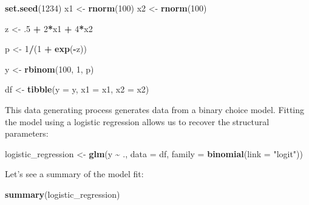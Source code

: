 \documentclass[
]{article}
\newenvironment{Shaded}{\begin{snugshade}}{\end{snugshade}}
\newcommand{\DataTypeTok}[1]{\textcolor[rgb]{0.13,0.29,0.53}{#1}}
\newcommand{\DecValTok}[1]{\textcolor[rgb]{0.00,0.00,0.81}{#1}}
\newcommand{\FloatTok}[1]{\textcolor[rgb]{0.00,0.00,0.81}{#1}}
\newcommand{\KeywordTok}[1]{\textcolor[rgb]{0.13,0.29,0.53}{\textbf{#1}}}
\newcommand{\NormalTok}[1]{#1}
\newcommand{\OperatorTok}[1]{\textcolor[rgb]{0.81,0.36,0.00}{\textbf{#1}}}
\newcommand{\StringTok}[1]{\textcolor[rgb]{0.31,0.60,0.02}{#1}}
\begin{document}
\begin{Shaded}
\begin{Highlighting}[]
\KeywordTok{set.seed}\NormalTok{(}\DecValTok{1234}\NormalTok{)}
\NormalTok{x1 \textless{}{-}}\StringTok{ }\KeywordTok{rnorm}\NormalTok{(}\DecValTok{100}\NormalTok{)}
\NormalTok{x2 \textless{}{-}}\StringTok{ }\KeywordTok{rnorm}\NormalTok{(}\DecValTok{100}\NormalTok{)}
  
\NormalTok{z \textless{}{-}}\StringTok{ }\FloatTok{.5} \OperatorTok{+}\StringTok{ }\DecValTok{2}\OperatorTok{*}\NormalTok{x1 }\OperatorTok{+}\StringTok{ }\DecValTok{4}\OperatorTok{*}\NormalTok{x2}

\NormalTok{p \textless{}{-}}\StringTok{ }\DecValTok{1}\OperatorTok{/}\NormalTok{(}\DecValTok{1} \OperatorTok{+}\StringTok{ }\KeywordTok{exp}\NormalTok{(}\OperatorTok{{-}}\NormalTok{z))}

\NormalTok{y \textless{}{-}}\StringTok{ }\KeywordTok{rbinom}\NormalTok{(}\DecValTok{100}\NormalTok{, }\DecValTok{1}\NormalTok{, p)}

\NormalTok{df \textless{}{-}}\StringTok{ }\KeywordTok{tibble}\NormalTok{(}\DataTypeTok{y =}\NormalTok{ y, }\DataTypeTok{x1 =}\NormalTok{ x1, }\DataTypeTok{x2 =}\NormalTok{ x2)}
\end{Highlighting}
\end{Shaded}

This data generating process generates data from a binary choice model. Fitting the model using a
logistic regression allows us to recover the structural parameters:

\begin{Shaded}
\begin{Highlighting}[]
\NormalTok{logistic\_regression \textless{}{-}}\StringTok{ }\KeywordTok{glm}\NormalTok{(y }\OperatorTok{\textasciitilde{}}\StringTok{ }\NormalTok{., }\DataTypeTok{data =}\NormalTok{ df, }\DataTypeTok{family =} \KeywordTok{binomial}\NormalTok{(}\DataTypeTok{link =} \StringTok{"logit"}\NormalTok{))}
\end{Highlighting}
\end{Shaded}

Let's see a summary of the model fit:

\begin{Shaded}
\begin{Highlighting}[]
\KeywordTok{summary}\NormalTok{(logistic\_regression)}
\end{Highlighting}
\end{Shaded}
\end{document}
